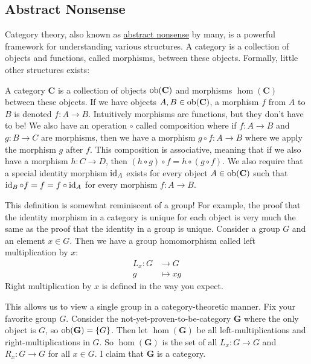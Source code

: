 \documentclass{article}
\begin{document}
\subsection*{Abstract Nonsense}

Category theory, also known as \href{https://en.wikipedia.org/wiki/Abstract_nonsense\#History}{abstract nonsense} by many, is a powerful framework for understanding various structures.
A category is a collection of objects and functions, called morphisms, between these objects.
Formally, little other structures exists:
\begin{defn}\label{defn:cat}
  A category $\textbf{C}$ is a collection of objects $\operatorname{ob}(\textbf{C})$ and morphisms $\hom(\textbf{C})$ between these objects.
  If we have objects $A, B \in \operatorname{ob}(\textbf{C})$, a morphism $f$ from $A$ to $B$ is denoted $f\colon A \to B$.
  Intuitively morphisms are functions, but they don't have to be!
  We also have an operation $\circ$ called composition where if $f\colon A \to B$ and $g\colon B \to C$ are morphisms, then we have a morphism $g \circ f\colon A \to B$ where we apply the morphism $g$ after $f$.
  This composition is associative, meaning that if we also have a morphism $h\colon C \to D$, then $(h \circ g) \circ f = h \circ (g \circ f)$.
  We also require that a special identity morphism $\operatorname{id}_{A}$ exists for every object $A \in \operatorname{ob}(\textbf{C})$ such that $\operatorname{id}_{B} \circ f = f = f \circ \operatorname{id}_{A}$ for every morphism $f\colon A \to B$.
\end{defn}

This definition is somewhat reminiscent of a group!
For example, the proof that the identity morphism in a category is unique for each object is very much the same as the proof that the identity in a group is unique.
Consider a group $G$ and an element $x \in G$.
Then we have a group homomorphism called left multiplication by $x$:
\begin{align*}
  L_{x}\colon G &\to G \\
              g &\mapsto xg
\end{align*}
Right multiplication by $x$ is defined in the way you expect.

This allows us to view a single group in a category-theoretic manner.
Fix your favorite group $G$.
Consider the not-yet-proven-to-be-category $\textbf{G}$ where the only object is $G$, so $\operatorname{ob}(\textbf{G}) = \{ G \}$.
Then let $\hom(\textbf{G})$ be all left-multiplications and right-multiplications in $G$.
So $\hom(\textbf{G})$ is the set of all $L_{x}\colon G \to G$ and $R_{x}\colon G \to G$ for all $x \in G$.
I claim that $\textbf{G}$ is a category.
\end{document}
